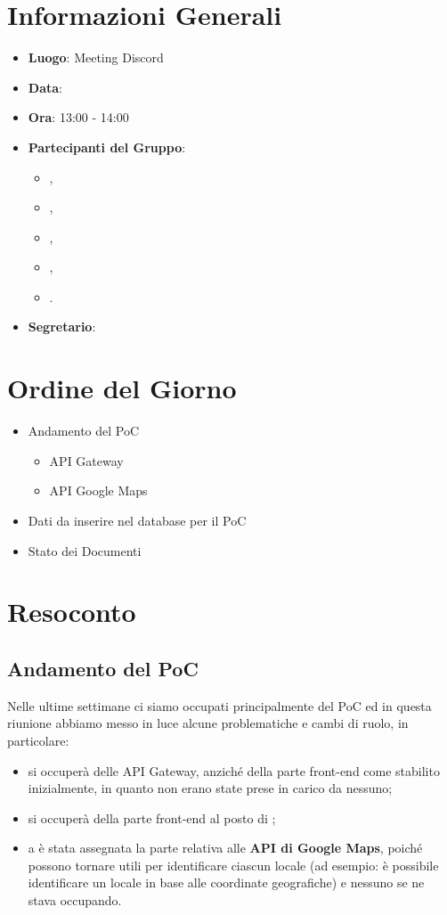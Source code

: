 \section{Informazioni Generali}

\begin{itemize}
\item{\textbf{Luogo}}: Meeting Discord
\item{\textbf{Data}}: \D
\item{\textbf{Ora}}: 13:00 - 14:00
\item{\textbf{Partecipanti del Gruppo}}: 
	\begin{itemize}
	\item{\EP{},} 
	\item{\FP{},}
	\item{\GC{},}
	\item{\LW{},}
	\item{\MG{}.}
	\end{itemize} 
\item{\textbf{Segretario}}: \GC{}	
\end{itemize}

\section{Ordine del Giorno}
\begin{itemize}
\item{Andamento del PoC}
\begin{itemize}
\item{API Gateway}
\item{API Google Maps}
\end{itemize}
\item{Dati da inserire nel database per il PoC}
\item{Stato dei Documenti}
\end{itemize}

\section{Resoconto}
 
\subsection{Andamento del PoC}

Nelle ultime settimane ci siamo occupati principalmente del PoC ed in questa riunione abbiamo messo in luce alcune problematiche e cambi di ruolo, in particolare: 
\begin{itemize}
\item \EP{} si occuperà delle API Gateway, anziché della parte front-end come stabilito inizialmente, in quanto non erano state prese in carico da nessuno;
\item \LW{} si occuperà della parte front-end al posto di \EP{};
\item a \PV{} è stata assegnata la parte relativa alle \textbf{API di Google Maps}, poiché possono tornare utili per identificare ciascun locale (ad esempio: è possibile identificare un locale in base alle coordinate geografiche) e nessuno se ne stava occupando.
\end{itemize}

